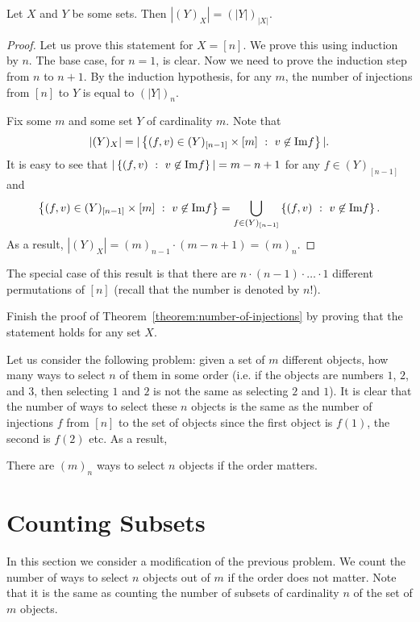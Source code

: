 \begin{theorem}
\label{theorem:number-of-injections}
  Let $X$ and $Y$ be some sets. Then $|(Y)_X| = (|Y|)_{|X|}$.
\end{theorem}
\begin{proof}
  Let us prove this statement for $X = [n]$. We prove this using induction by
  $n$. The base case, for $n = 1$, is clear. Now we need to prove the induction
  step from $n$ to $n + 1$. By the induction hypothesis, for any $m$, the
  number of injections from $[n]$ to $Y$ is equal to $(|Y|)_n$.

  Fix some $m$ and some set $Y$ of cardinality $m$. Note that
  \[
    |(Y)_X| =
    |\set[v \not\in \Im f]{(f, v) \in (Y)_{[n - 1]} \times [m]}|.
  \]
  It is easy to see that $|\set[v \not\in \Im f]{(f, v)}| = m - n + 1$
  for any $f \in (Y)_{[n - 1]}$ and
  \[
    \set[v \not\in \Im f]{(f, v) \in (Y)_{[n - 1]} \times [m]} =
    \bigcup_{f \in (Y)_{[n - 1]}} \set[v \not\in \Im f]{(f, v)}.
  \]
  As a result, $|(Y)_X| = (m)_{n - 1} \cdot (m - n + 1) = (m)_n$.
\end{proof}

The special case of this result is that there are
$n \cdot (n - 1) \cdot  \ldots \cdot  1$ different
permutations of $[n]$ (recall that the number is denoted by $n!$).

\begin{exercise}
  Finish the proof of Theorem~\ref{theorem:number-of-injections} by proving that
  the statement holds for any set $X$.
\end{exercise}

Let us consider the following problem: given a set of $m$ different objects,
how many ways to select $n$ of them in some order (i.e. if the objects are
numbers $1$, $2$, and $3$, then selecting $1$ and $2$ is not the same as
selecting $2$ and $1$). It is clear that the number of ways to select these $n$
objects is the same as the number of injections $f$ from $[n]$ to the set of
objects since the first object is $f(1)$, the second is $f(2)$ etc.
As a result,
\begin{corollary}
  There are $(m)_n$ ways to select $n$ objects if the order matters.
\end{corollary}

\section{Counting Subsets}
In this section we consider a modification of the previous problem. We count
the number of ways to select $n$ objects out of $m$ if the order does not
matter. Note that it is the same as counting the number of subsets of
cardinality $n$ of the set of $m$ objects.

